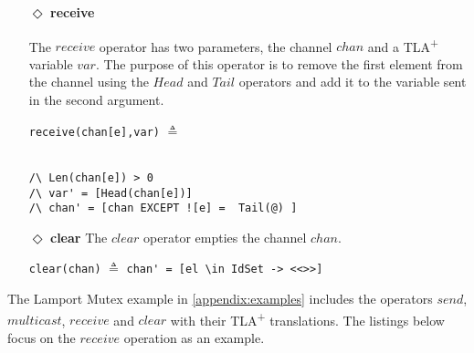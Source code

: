 \documentclass{thesul}
\newcommand{\tlaplus}{TLA\textsuperscript{+}\xspace}
\begin{document}
\begin{itemize}
\begin{minipage}{.44\textwidth}

\lstinline!multicast(chan, [a \in sub |-> msg])! $\triangleq$\\\\\\
\end{minipage}\hfill
\begin{minipage}{.6\textwidth}
\begin{lstlisting}[frame = none, numbers = none]
chan'=[a \in DOMAIN chan 
			|-> IF a \in sub 
       THEN Append(chan[a], msg)
       ELSE chan[a]
\end{lstlisting}

\end{minipage}\hfill


\item[$\Diamond$]  \textbf{receive}

The $receive$ operator has two parameters, the channel $chan$ and a \tlaplus variable $var$. The purpose of this operator is to remove the first element from the channel using the $Head$ and $Tail$ operators and add it to the variable sent in the second argument.

\begin{minipage}{.3\textwidth}

\lstinline|receive(chan[e],var)| $\triangleq$\\\\
\end{minipage}\hfill
\begin{minipage}{.7\textwidth}
\begin{lstlisting}[frame = none, numbers = none]
/\ Len(chan[e]) > 0 
/\ var' = [Head(chan[e])]
/\ chan' = [chan EXCEPT ![e] =  Tail(@) ]
\end{lstlisting}

\end{minipage}\hfill

\item[$\Diamond$]  \textbf{clear}
The $clear$ operator empties the channel $chan$.

\begin{center}

\lstinline|clear(chan)| $\triangleq$
\lstinline|chan' = [el \in IdSet -> <<>>]|

\end{center}
\end{itemize}

The Lamport Mutex example in \ref{appendix:examples} includes the operators $send$, $multicast$, $receive$ and $clear$ with their \tlaplus translations. The listings below focus on the $receive$ operation as an example.
\end{document}
